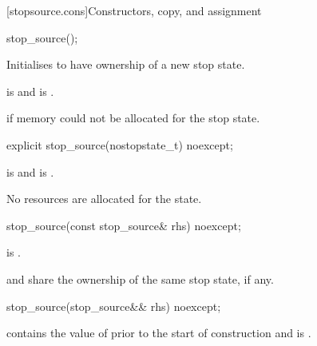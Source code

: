 [stopsource.cons]{Constructors, copy, and assignment}

%
\begin{itemdecl}
stop_source();
\end{itemdecl}

\begin{itemdescr}
\pnum
\effects Initialises  to have ownership of a new stop state.

\pnum
\ensures {} is 
and  is .

\pnum
\throws {} if memory could not be allocated for the stop state.
\end{itemdescr}

%
\begin{itemdecl}
explicit stop_source(nostopstate_t) noexcept;
\end{itemdecl}

\begin{itemdescr}
\pnum
\ensures
{} is  and
 is .
\begin{note} No resources are allocated for the state.  \end{note}
\end{itemdescr}

%
\begin{itemdecl}
stop_source(const stop_source& rhs) noexcept;
\end{itemdecl}

\begin{itemdescr}
\pnum
\ensures {} is .
\begin{note}
 and  share the ownership of the same stop state,
if any.
\end{note}
\end{itemdescr}

%
\begin{itemdecl}
stop_source(stop_source&& rhs) noexcept;
\end{itemdecl}

\begin{itemdescr}
\pnum
\ensures
{} contains the value of 
prior to the start of construction
and  is .
\end{itemdescr}

